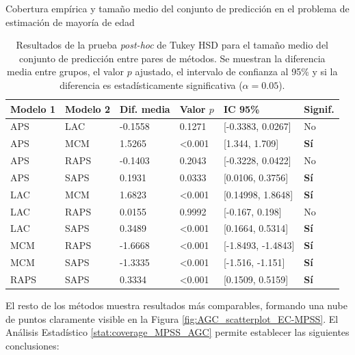 \begin{StatisticsRef}{Cobertura empírica y tamaño medio del conjunto de predicción en el problema de estimación de mayoría de edad}
    \renewcommand{\arraystretch}{1.2}
    \begin{table}[H]
        \small
        \centering
        \begin{tabular}{llllll}
        \toprule
        \textbf{Modelo 1} & \textbf{Modelo 2} & \textbf{Dif. media} & \textbf{Valor $p$} & \textbf{IC 95\%} & \textbf{Signif.} \\ \hline
        APS & LAC & -0.1558	& 0.1271 & [-0.3383, 0.0267] & No \\
        APS & MCM & 1.5265 & \textless 0.001 & [1.344, 1.709] & \textbf{Sí} \\
        APS & RAPS & -0.1403 & 0.2043 & [-0.3228, 0.0422] & No \\
        APS & SAPS & 0.1931 & 0.0333 & [0.0106, 0.3756] & \textbf{Sí} \\
        LAC & MCM & 1.6823 & \textless 0.001 & [0.14998, 1.8648] & \textbf{Sí} \\
        LAC & RAPS & 0.0155	& 0.9992 & [-0.167, 0.198] & No \\
        LAC & SAPS & 0.3489 & \textless 0.001 & [0.1664, 0.5314] & \textbf{Sí} \\
        MCM & RAPS & -1.6668 & \textless 0.001 & [-1.8493, -1.4843] & \textbf{Sí} \\
        MCM & SAPS & -1.3335 & \textless 0.001 & [-1.516, -1.151] & \textbf{Sí} \\
        RAPS & SAPS & 0.3334 & \textless 0.001 & [0.1509, 0.5159] & \textbf{Sí} \\
        \bottomrule
        \end{tabular}
        \caption[
            Problema de clasificación de edad: 
            Resultados de la prueba \textit{post-hoc} de Tukey HSD para el tamaño medio del conjunto de predicción entre pares de métodos.
        ]{
            Resultados de la prueba \textit{post-hoc} de Tukey HSD para el tamaño medio del conjunto de predicción entre pares de métodos.
            Se muestran la diferencia media entre grupos, el valor $p$ ajustado, el intervalo de confianza al 95\% y si la diferencia es estadísticamente significativa ($\alpha = 0.05$).
        }
        \label{tab:AGC_tukey_MPSS}
    \end{table}
\end{StatisticsRef}


El resto de los métodos muestra resultados más comparables, formando una nube de puntos claramente visible en la Figura \ref{fig:AGC_scatterplot_EC-MPSS}. El Análisis Estadístico \ref{stat:coverage_MPSS_AGC} permite establecer las siguientes conclusiones:

